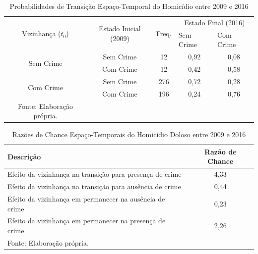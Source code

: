 \documentclass[12pt,openright,oneside,a4paper,english,french,spanish]{abntex2}
\numberwithin{table}{section} %
\numberwithin{figure}{section} %
\begin{document}
\begin{subappendices}
\begin{table}[H]
\centering
\caption{Probabilidades de Transição Espaço-Temporal do Homicídio entre 2009 e 2016}
        \begin{tabular}{ccccc}
            \hline
            \multirow{2}{*}{Vizinhança ($t_0$)} & \multirow{2}{*}{Estado Inicial (2009)} & \multirow{2}{*}{Freq.} & \multicolumn{2}{c}{Estado Final (2016)}  \\\cline{4-5} %
                                        & & & \multicolumn{1}{l}{Sem Crime} & \multicolumn{1}{l}{Com Crime} \\\hline
            \multirow{2}{*}{Sem Crime} & {Sem Crime} & 12 &  {0,92} & {0,08} \\
                                       & {Com Crime} & 12 &  {0,42} & {0,58} \\\hline
            \multirow{2}{*}{Com Crime} & {Sem Crime} & 276 & {0,72} & {0,28} \\
                                       & {Com Crime} & 196 & {0,24} & {0,76} \\\hline
            \tiny Fonte: Elaboração própria.
        \end{tabular}
    \label{tab:prob_espaco_tempo_hom_dol_2009_2016}
\end{table}


\begin{table}[H]
\centering
\caption{Razões de Chance Espaço-Temporais do Homicídio Doloso entre 2009 e 2016}
        \begin{tabular}{lc}
            \hline
            {\textbf{Descrição}} & {\textbf{Razão de Chance}} \\\hline
            {Efeito da vizinhança na transição para presença de crime} & {4,33} \\
            {Efeito da vizinhança na transição para ausência de crime} & {0,44} \\
            {Efeito da vizinhança em permanecer na ausência de crime} & {0,23} \\
            {Efeito da vizinhança em permanecer na presença de crime} & {2,26} \\\hline
            \tiny Fonte: Elaboração própria.
        \end{tabular}
    \label{tab:odds_espaco_tempo_hom_dol_2009_2016}
\end{table}
















\end{subappendices}
\end{document}
